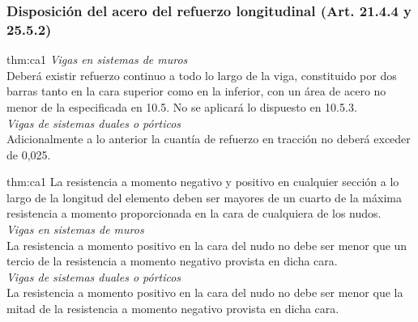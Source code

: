 \subsubsection{Disposición del acero del refuerzo longitudinal (Art. 21.4.4 y 25.5.2)}
\begin{theo}[Art. 21.4.4.1 y 21.5.2.1 :]{thm:ca1}
\textit{Vigas en sistemas de muros}\\
Deberá existir refuerzo continuo a todo lo largo de la viga, constituido por dos barras tanto en la cara superior como en la inferior, con un área de acero no menor de la especificada en 10.5. No se aplicará lo dispuesto en 10.5.3.\\
\textit{Vigas de sistemas duales o pórticos}\\
Adicionalmente a lo anterior la cuantía de refuerzo en tracción no deberá exceder de 0,025.
\end{theo}
\begin{theo}[Art. 21.4.4.3 y 21.5.2.2 :]{thm:ca1}
La resistencia a momento negativo y positivo en cualquier sección a lo largo de la longitud del elemento deben ser mayores de un cuarto de la máxima resistencia a momento proporcionada en la cara de cualquiera de los nudos.\\
\textit{Vigas en sistemas de muros}\\
La resistencia a momento positivo en la cara del nudo no debe ser menor que un tercio de la resistencia a momento negativo provista en dicha cara.\\
\textit{Vigas de sistemas duales o pórticos}\\
La resistencia a momento positivo en la cara del nudo no debe ser menor que la mitad de la resistencia a momento negativo provista en dicha cara.
\end{theo}

